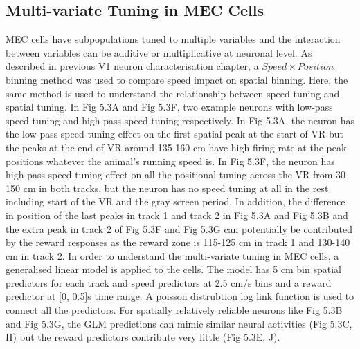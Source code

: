 \subsection{Multi-variate Tuning in MEC Cells}
MEC cells have subpopulations tuned to multiple variables and the interaction between variables can be additive or multiplicative at neuronal level. As described in previous V1 neuron characterisation chapter, a \(Speed \times Position \) binning method was used to compare speed impact on spatial binning. Here, the same method is used to understand the relationship between speed tuning and spatial tuning. In Fig 5.3A and Fig 5.3F, two example neurons with low-pass speed tuning and high-pass speed tuning respectively. In Fig 5.3A, the neuron has the low-pass speed tuning effect on the first spatial peak at the start of VR but the peaks at the end of VR around 135-160 cm have high firing rate at the peak positions whatever the animal's running speed is. In Fig 5.3F, the neuron has high-pass speed tuning effect on all the positional tuning across the VR from 30-150 cm in both tracks, but the neuron has no speed tuning at all in the rest including start of the VR and the gray screen period. In addition, the difference in position of the last peaks in track 1 and track 2 in Fig 5.3A and Fig 5.3B and the extra peak in track 2 of Fig 5.3F and Fig 5.3G can potentially be contributed by the reward responses as the reward zone is 115-125 cm in track 1 and 130-140 cm in track 2. In order to understand the multi-variate tuning in MEC cells, a generalised linear model is applied to the cells. The model has 5 cm bin spatial predictors for each track and speed predictors at 2.5 cm/s bins and a reward predictor at [0, 0.5]s time range. A poisson distrubtion log link function is used to connect all the predictors. For spatially relatively reliable neurons like Fig 5.3B and Fig 5.3G, the GLM predictions can mimic similar neural activities (Fig 5.3C, H) but the reward predictors contribute very little (Fig 5.3E, J). 
